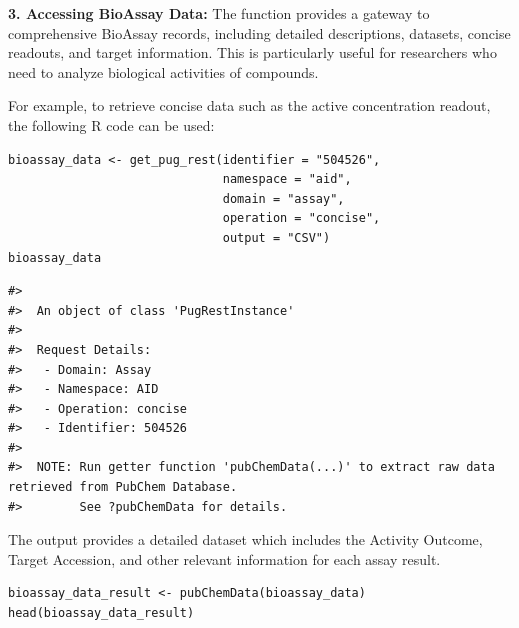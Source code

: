 \textbf{3. Accessing BioAssay Data:} The function provides a gateway to comprehensive BioAssay records, including detailed descriptions, datasets, concise readouts, and target information. This is particularly useful for researchers who need to analyze biological activities of compounds.

For example, to retrieve concise data such as the active concentration readout, the following R code can be used:

\begin{verbatim}
bioassay_data <- get_pug_rest(identifier = "504526", 
                              namespace = "aid", 
                              domain = "assay", 
                              operation = "concise", 
                              output = "CSV")
bioassay_data
\end{verbatim}

\begin{verbatim}
#> 
#>  An object of class 'PugRestInstance'
#> 
#>  Request Details:  
#>   - Domain: Assay
#>   - Namespace: AID
#>   - Operation: concise
#>   - Identifier: 504526
#> 
#>  NOTE: Run getter function 'pubChemData(...)' to extract raw data retrieved from PubChem Database. 
#>        See ?pubChemData for details.
\end{verbatim}

The output provides a detailed dataset which includes the Activity Outcome, Target Accession, and other relevant information for each assay result.

\begin{verbatim}
bioassay_data_result <- pubChemData(bioassay_data)
head(bioassay_data_result)
\end{verbatim}

